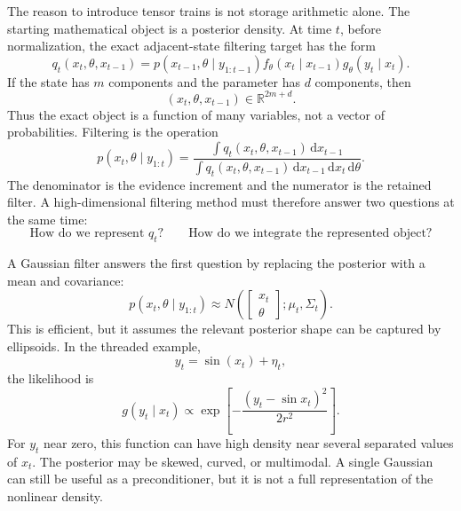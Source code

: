 \documentclass[11pt]{article}
\numberwithin{equation}{section}
\newcommand{\R}{\mathbb R}
\newcommand{\dd}{\,\mathrm d}
\begin{document}
The reason to introduce tensor trains is not storage arithmetic alone.  The
starting mathematical object is a posterior density.  At time \(t\), before
normalization, the exact adjacent-state filtering target has the form
\begin{equation}
    q_t(x_t,\theta,x_{t-1})
    =
    p(x_{t-1},\theta\mid y_{1:t-1})
    f_\theta(x_t\mid x_{t-1})
    g_\theta(y_t\mid x_t).
    \label{eq:p25-bridge-1}
\end{equation}
If the state has \(m\) components and the parameter has \(d\) components, then
\begin{equation}
    (x_t,\theta,x_{t-1})\in\R^{2m+d}.
    \label{eq:p25-bridge-2}
\end{equation}
Thus the exact object is a function of many variables, not a vector of
probabilities.  Filtering is the operation
\begin{equation}
    p(x_t,\theta\mid y_{1:t})
    =
    \frac{\int q_t(x_t,\theta,x_{t-1})\dd x_{t-1}}
    {\int q_t(x_t,\theta,x_{t-1})\dd x_{t-1}\dd x_t\dd\theta}.
    \label{eq:p25-bridge-3}
\end{equation}
The denominator is the evidence increment and the numerator is the retained
filter.  A high-dimensional filtering method must therefore answer two
questions at the same time:
\begin{equation}
    \text{How do we represent }q_t?
    \qquad
    \text{How do we integrate the represented object?}
    \label{eq:p25-bridge-4}
\end{equation}

A Gaussian filter answers the first question by replacing the posterior with a
mean and covariance:
\begin{equation}
    p(x_t,\theta\mid y_{1:t})
    \approx
    N\!\left(
    \begin{bmatrix}x_t\\\theta\end{bmatrix};
    \mu_t,\Sigma_t
    \right).
    \label{eq:p25-bridge-5}
\end{equation}
This is efficient, but it assumes the relevant posterior shape can be captured
by ellipsoids.  In the threaded example,
\begin{equation}
    y_t=\sin(x_t)+\eta_t,
    \label{eq:p25-bridge-6}
\end{equation}
the likelihood is
\begin{equation}
    g(y_t\mid x_t)
    \propto
    \exp\!\left[
    -\frac{(y_t-\sin x_t)^2}{2r^2}
    \right].
    \label{eq:p25-bridge-7}
\end{equation}
For \(y_t\) near zero, this function can have high density near several
separated values of \(x_t\).  The posterior may be skewed, curved, or
multimodal.  A single Gaussian can still be useful as a preconditioner, but it
is not a full representation of the nonlinear density.
\end{document}
